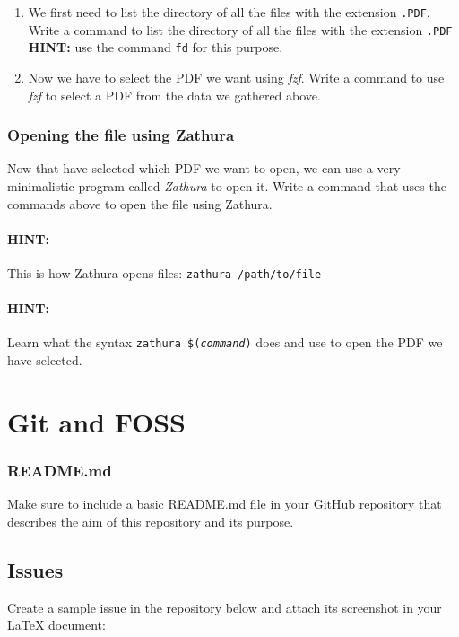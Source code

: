 \documentclass[12pt]{article}
\begin{document}
\begin{enumerate}
    \item We first need to list the directory of all the files with the extension \texttt{.PDF}. Write a command to list the directory of all the files with the extension \texttt{.PDF} \\
        \textbf{HINT:} use the command \texttt{fd} for this purpose.
    \item Now we have to select the PDF we want using \textit{fzf}. Write a command to use \textit{fzf} to select a PDF from the data we gathered above.
\end{enumerate}

\subsubsection{Opening the file using Zathura}
Now that have selected which PDF we want to open, we can use a very minimalistic program called \textit{Zathura} to open it. Write a command that uses the
commands above to open the file using Zathura.
\paragraph{HINT:} This is how Zathura opens files: \texttt{zathura /path/to/file}
\paragraph{HINT:} Learn what the syntax \texttt{zathura \$(\textit{command})} does and use to open the PDF we have selected.

\section{Git and FOSS}
\subsubsection{README.md}
Make sure to include a basic README.md file in your GitHub repository that describes the aim of this repository and its purpose.

\subsection{Issues}
Create a sample issue in the repository below and attach its screenshot in your LaTeX document:

\url{}

\pagebreak
\end{document}
